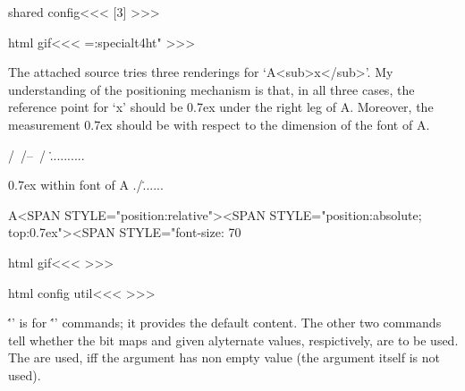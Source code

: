 {{{

\<shared config\><<<
[3]{}
>>>




\Verbatim
\EndVerbatim

\<html gif\><<<
\def\Canvas{\ht:special{t4ht"}}
\let\EndCanvas|=\Canvas
>>>









  

The attached source tries three renderings for `A<sub>x</sub>'.  My
understanding of the positioning mechanism is that, in all three cases,
the reference point for `x' should be 0.7ex under the right leg of A.
Moreover, the measurement 0.7ex should be with respect to the
dimension of the font of A.

\Verbatim

           /\
          /--\
         /    \...........
                \/       } 0.7ex within font of A
               ./\.......}


                      A<SPAN 
STYLE="position:relative"><SPAN 
STYLE="position:absolute; top:0.7ex"><SPAN 
STYLE="font-size: 70%
\EndVerbatim















\<html gif\><<<
\def\:img{%
   \ifx       *\:temp  \let\:temp|=\i:mgif \let\:next|=\:GIf
   \else \ifx +\:temp  \let\:temp|=\i:mgif \let\:next|=\:Gif
   \else \ifx [\:temp  \let\:temp|=\im:g
   \else               \def\:temp{\im:g[{\csname
                                        a:Picture-alt\endcsname}]}%
   \fi \fi \fi  \:temp}
>>>

\<html config util\><<<
>>>




\''' is for \''' commands; it
provides the default content.  The other two commands tell whether the
bit maps and given alyternate values, respictively, are to be used.
The are used, iff the argument has non empty value (the argument
itself is not used).




}
